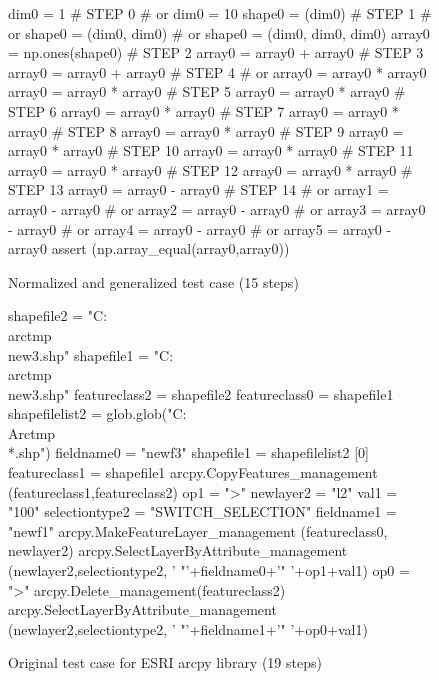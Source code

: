 \begin{figure}
{\scriptsize
\begin{code}
dim0 = 1                            \# STEP 0
\#  or dim0 = 10 
shape0 = (dim0)                     \# STEP 1
\#  or shape0 = (dim0, dim0) 
\#  or shape0 = (dim0, dim0, dim0) 
array0 = np.ones(shape0)            \# STEP 2
array0 = array0 + array0            \# STEP 3
array0 = array0 + array0            \# STEP 4
\#  or array0 = array0 * array0 
array0 = array0 * array0            \# STEP 5
array0 = array0 * array0            \# STEP 6
array0 = array0 * array0            \# STEP 7
array0 = array0 * array0            \# STEP 8
array0 = array0 * array0            \# STEP 9
array0 = array0 * array0            \# STEP 10
array0 = array0 * array0            \# STEP 11
array0 = array0 * array0            \# STEP 12
array0 = array0 * array0            \# STEP 13
array0 = array0 - array0            \# STEP 14
\#  or array1 = array0 - array0 
\#  or array2 = array0 - array0 
\#  or array3 = array0 - array0 
\#  or array4 = array0 - array0 
\#  or array5 = array0 - array0 
assert (np.array\_equal(array0,array0))
\end{code}
}
\caption{Normalized and generalized test case (15 steps)}
\end{figure}

\begin{figure}
{\scriptsize 
\begin{code}
shapefile2 = "C:\\arctmp\\new3.shp" 
shapefile1 = "C:\\arctmp\\new3.shp" 
featureclass2 = shapefile2 
featureclass0 = shapefile1 
shapefilelist2 = 
   glob.glob("C:\\Arctmp\\*.shp") 
fieldname0 = "newf3" 
shapefile1 = shapefilelist2 [0] 
featureclass1 = shapefile1 
arcpy.CopyFeatures\_management
   (featureclass1,featureclass2) 
op1 = ">" 
newlayer2 = "l2" 
val1 = "100" 
selectiontype2 = "SWITCH\_SELECTION" 
fieldname1 = "newf1" 
arcpy.MakeFeatureLayer\_management
   (featureclass0, newlayer2) 
arcpy.SelectLayerByAttribute\_management
   (newlayer2,selectiontype2,
   ' "'+fieldname0+'" '+op1+val1) 
op0 = ">" 
arcpy.Delete\_management(featureclass2) 
arcpy.SelectLayerByAttribute\_management
   (newlayer2,selectiontype2,
   ' "'+fieldname1+'" '+op0+val1) 
\end{code}
}
\caption{Original test case for ESRI arcpy library (19 steps)}
\end{figure}

